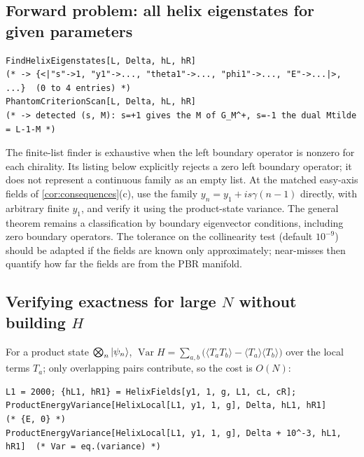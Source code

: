 \documentclass[11pt,a4paper]{article}
\theoremstyle{definition}
\begin{document}
\subsection{Forward problem: all helix eigenstates for given parameters}
\begin{lstlisting}
FindHelixEigenstates[L, Delta, hL, hR]
(* -> {<|"s"->1, "y1"->..., "theta1"->..., "phi1"->..., "E"->...|>, ...}  (0 to 4 entries) *)
PhantomCriterionScan[L, Delta, hL, hR]
(* -> detected (s, M): s=+1 gives the M of G_M^+, s=-1 the dual Mtilde = L-1-M *)
\end{lstlisting}
The finite-list finder is exhaustive when the left boundary operator is nonzero for each chirality. Its listing below explicitly rejects a zero left boundary operator; it does not represent a continuous family as an empty list. At the matched easy-axis fields of \cref{cor:consequences}(c), use the family $y_n=y_1+is\gamma(n-1)$ directly, with arbitrary finite $y_1$, and verify it using the product-state variance. The general theorem remains a classification by boundary eigenvector conditions, including zero boundary operators. The tolerance on the collinearity test (default $10^{-9}$) should be adapted if the fields are known only approximately; near-misses then quantify how far the fields are from the PBR manifold.

\subsection{Verifying exactness for large $N$ without building $H$}
For a product state $\bigotimes_n\ket{\psi_n}$, $\operatorname{Var}H=\sum_{a,b}\big(\langle T_aT_b\rangle-\langle T_a\rangle\langle T_b\rangle\big)$ over the local terms $T_a$; only overlapping pairs contribute, so the cost is $O(N)$:
\begin{lstlisting}
L1 = 2000; {hL1, hR1} = HelixFields[y1, 1, g, L1, cL, cR];
ProductEnergyVariance[HelixLocal[L1, y1, 1, g], Delta, hL1, hR1]          (* {E, 0} *)
ProductEnergyVariance[HelixLocal[L1, y1, 1, g], Delta + 10^-3, hL1, hR1]  (* Var = eq.(variance) *)
\end{lstlisting}
\end{document}
